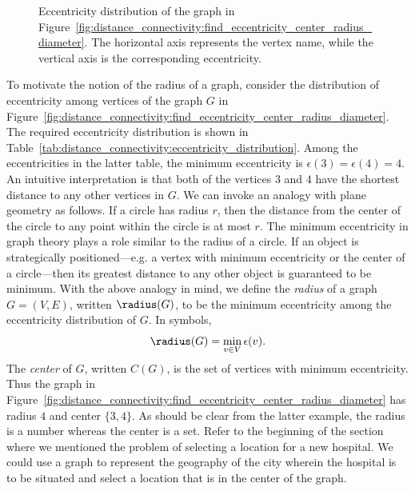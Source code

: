 \begin{figure}[!htbp]
\centering
{}

\caption{Eccentricity distribution of the graph in
  Figure~\ref{fig:distance_connectivity:find_eccentricity_center_radius_diameter}.
  The horizontal axis represents the vertex name, while the vertical
  axis is the corresponding eccentricity.}
\label{fig:distance_connectivity:eccentricity_distribution}
\end{figure}

To motivate the notion of the radius of a graph, consider the
distribution of eccentricity among vertices of the graph $G$ in
Figure~\ref{fig:distance_connectivity:find_eccentricity_center_radius_diameter}.
The required eccentricity distribution is shown in
Table~\ref{tab:distance_connectivity:eccentricity_distribution}. Among
the eccentricities in the latter table, the minimum eccentricity is
$\epsilon(3) = \epsilon(4) = 4$. An intuitive interpretation is that
both of the vertices $3$ and $4$ have the shortest distance to any
other vertices in $G$. We can invoke an analogy with plane geometry as
follows. If a circle has radius $r$, then the distance from the center
of the circle to any point within the circle is at most $r$. The
minimum eccentricity in graph theory plays a role similar to the
radius of a circle. If an object is strategically
positioned---e.g. a vertex with minimum eccentricity or the center of
a circle---then its greatest distance to any other object is
guaranteed to be minimum. With the above analogy in mind, we define
the \emph{radius} of a graph $G = (V,E)$, written
$\radius(G)$, to be the minimum eccentricity among
the eccentricity distribution of $G$. In symbols,
\[
\radius(G)
=
\min_{v \in V} \epsilon(v).
\]
The \emph{center} of $G$, written $C(G)$, is the set of vertices with
minimum eccentricity. Thus the graph in
Figure~\ref{fig:distance_connectivity:find_eccentricity_center_radius_diameter}
has radius $4$ and center $\{3, 4\}$. As should be clear from the
latter example, the radius is a number whereas the center is a
set. Refer to the beginning of the section where we mentioned the
problem of selecting a location for a new hospital. We could use a
graph to represent the geography of the city wherein the hospital is
to be situated and select a location that is in the center of the
graph.

